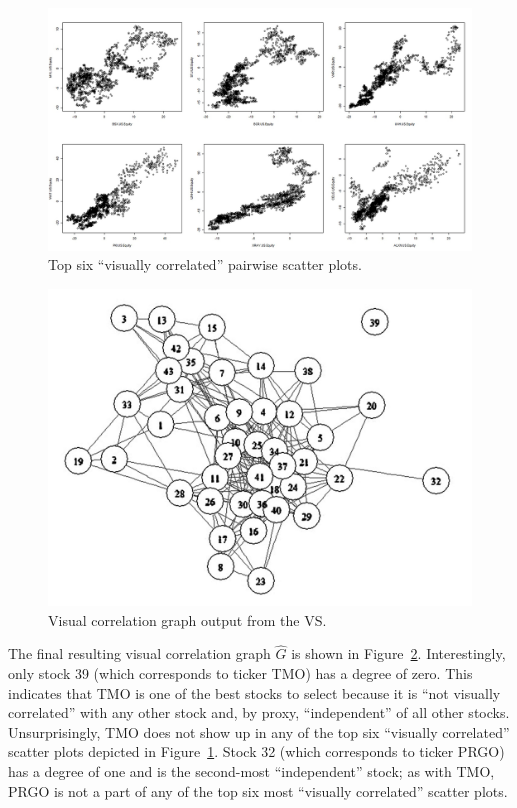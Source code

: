\begin{figure}[htb]
	\begin{center}
		\includegraphics[width=1\linewidth]
		{ch-usage/figures/topinterestingplots}
		\caption[Top six ``visually correlated'' pairwise scatter plots.]{Top 
		six ``visually correlated'' pairwise scatter plots.}
		\label{fig:usage:interestingplots}
	\end{center}
\end{figure}

\tablespacing
\begin{figure}[H]
	\begin{center}
		\includegraphics[width=0.6\linewidth]
		{ch-usage/figures/visgraph}
		\caption[Visual correlation graph output from the VS.]{Visual 
		correlation graph output from the VS.}
		\label{fig:usage:visg}
	\end{center}
\end{figure}
\bodyspacing

The final resulting visual correlation graph $\hat{G}$ is shown in 
Figure~\ref{fig:usage:visg}. Interestingly, only stock 39 (which corresponds to 
ticker TMO) has a degree of zero. This indicates 
that TMO is one of the best stocks to select because it is ``not visually
correlated'' with any other stock and, by proxy, ``independent'' of all other 
stocks. Unsurprisingly, 
TMO does not show up in any of the top six ``visually correlated'' scatter 
plots depicted in Figure~\ref{fig:usage:interestingplots}. Stock 32 (which 
corresponds to ticker PRGO) has a degree of one and is the second-most 
``independent'' stock; as with TMO, PRGO is not a part of any of the top six 
most ``visually correlated'' scatter plots.

